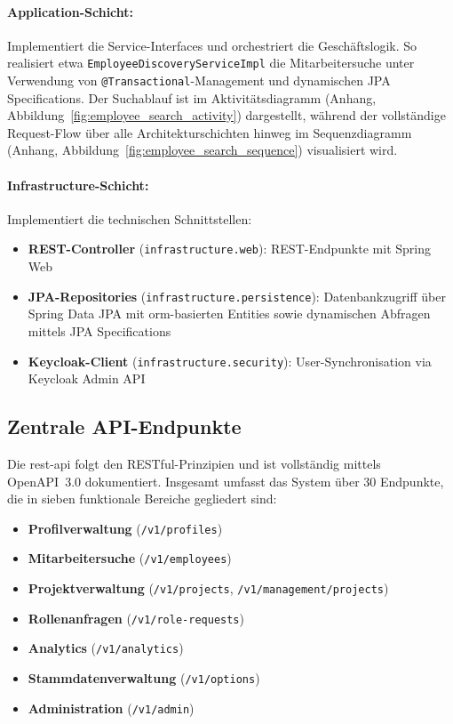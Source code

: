 \paragraph{Application-Schicht:}
Implementiert die Service-Interfaces und orchestriert die Geschäftslogik. So realisiert etwa \texttt{EmployeeDiscoveryServiceImpl} die Mitarbeitersuche unter Verwendung von \texttt{@Transactional}-Management und dynamischen JPA Specifications. Der Suchablauf ist im Aktivitätsdiagramm (Anhang, Abbildung~\ref{fig:employee_search_activity}) dargestellt, während der vollständige Request-Flow über alle Architekturschichten hinweg im Sequenzdiagramm (Anhang, Abbildung~\ref{fig:employee_search_sequence}) visualisiert wird.

\paragraph{Infrastructure-Schicht:}
Implementiert die technischen Schnittstellen:
\begin{itemize}
    \item \textbf{REST-Controller} (\texttt{infrastructure.web}): REST-Endpunkte mit Spring Web
    \item \textbf{JPA-Repositories} (\texttt{infrastructure.persistence}): Datenbankzugriff über Spring Data JPA mit \gls{orm}-basierten Entities sowie dynamischen Abfragen mittels JPA Specifications
    \item \textbf{Keycloak-Client} (\texttt{infrastructure.security}): User-Synchronisation via Keycloak Admin API
\end{itemize}

\subsection{Zentrale API-Endpunkte}

Die \gls{rest}-\gls{api}\cite{rest_api_design} folgt den RESTful-Prinzipien und ist vollständig mittels OpenAPI~3.0\cite{openapi_docs} dokumentiert. Insgesamt umfasst das System über 30 Endpunkte, die in sieben funktionale Bereiche gegliedert sind:

\begin{itemize}
    \item \textbf{Profilverwaltung} (\texttt{/v1/profiles})
    \item \textbf{Mitarbeitersuche} (\texttt{/v1/employees})
    \item \textbf{Projektverwaltung} (\texttt{/v1/projects}, \texttt{/v1/management/projects})
    \item \textbf{Rollenanfragen} (\texttt{/v1/role-requests})
    \item \textbf{Analytics} (\texttt{/v1/analytics})
    \item \textbf{Stammdatenverwaltung} (\texttt{/v1/options})
    \item \textbf{Administration} (\texttt{/v1/admin})
\end{itemize}

